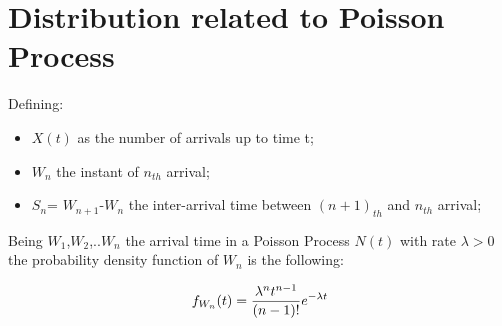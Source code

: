 \section{Distribution related to Poisson Process}
Defining:
\begin{itemize}
	\item $X(t)$ as the number of arrivals up to time t;
	\item $W_n$ the instant of $n_{th}$ arrival;
	\item $S_n$= $W_{n+1}$-$W_n$ the inter-arrival time between $(n+1)_{th}$ and $n_{th}$ arrival;
\end{itemize}


	\begin{theorem}
		Being $W_{1}$,$W_{2}$,..$W_{n}$ the arrival time in a Poisson Process $N(t)$ with rate ${\lambda}>0$ the probability density function of $W_n$ is the following:

			\begin{equation}
			f_{W_n} (t )=\frac{\lambda^n t^{n-1}} {(n-1)!}e^{-\lambda t} \\
			\end{equation}
	\end{theorem}

